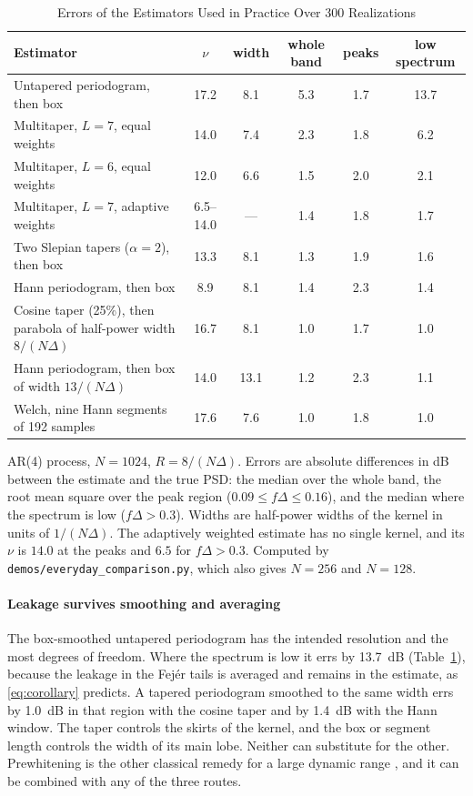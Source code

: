 \documentclass[10pt,twocolumn]{article}
\begin{document}
\begin{table}[!t]
\caption{Errors of the Estimators Used in Practice Over 300 Realizations}
\label{tab:ensemble}
\centering
\footnotesize
\begin{tabular}{lccccc}
\toprule
Estimator & $\nu$ & width & whole band & peaks & low spectrum\\
\midrule
Untapered periodogram, then box & 17.2 & 8.1 & 5.3 & 1.7 & 13.7\\
Multitaper, $L=7$, equal weights & 14.0 & 7.4 & 2.3 & 1.8 & 6.2\\
Multitaper, $L=6$, equal weights & 12.0 & 6.6 & 1.5 & 2.0 & 2.1\\
Multitaper, $L=7$, adaptive weights & 6.5--14.0 & --- & 1.4 & 1.8 & 1.7\\
Two Slepian tapers ($\alpha=2$), then box & 13.3 & 8.1 & 1.3 & 1.9 & 1.6\\
Hann periodogram, then box & 8.9 & 8.1 & 1.4 & 2.3 & 1.4\\
Cosine taper (25\%), then parabola of half-power width $8/(N\Delta)$ & 16.7 & 8.1 & 1.0 & 1.7 & 1.0\\
Hann periodogram, then box of width $13/(N\Delta)$ & 14.0 & 13.1 & 1.2 & 2.3 & 1.1\\
Welch, nine Hann segments of 192 samples & 17.6 & 7.6 & 1.0 & 1.8 & 1.0\\
\bottomrule
\end{tabular}

\vspace{3pt}
\parbox{0.92\textwidth}{\footnotesize AR(4) process, $N=1024$, $R=8/(N\Delta)$. Errors are absolute differences in dB between the estimate and the true PSD: the median over the whole band, the root mean square over the peak region ($0.09\le f\Delta\le0.16$), and the median where the spectrum is low ($f\Delta>0.3$). Widths are half-power widths of the kernel in units of $1/(N\Delta)$. The adaptively weighted estimate has no single kernel, and its $\nu$ is $14.0$ at the peaks and $6.5$ for $f\Delta>0.3$. Computed by \texttt{demos/everyday\_comparison.py}, which also gives $N=256$ and $N=128$.}
\end{table}

\paragraph{Leakage survives smoothing and averaging} The box-smoothed untapered periodogram has the intended resolution and the most degrees of freedom. Where the spectrum is low it errs by 13.7~dB (Table~\ref{tab:ensemble}), because the leakage in the Fej\'er tails is averaged and remains in the estimate, as \eqref{eq:corollary} predicts. A tapered periodogram smoothed to the same width errs by 1.0~dB in that region with the cosine taper and by 1.4~dB with the Hann window. The taper controls the skirts of the kernel, and the box or segment length controls the width of its main lobe. Neither can substitute for the other. Prewhitening is the other classical remedy for a large dynamic range \cite{blackman1958,percival1993}, and it can be combined with any of the three routes.
\end{document}
